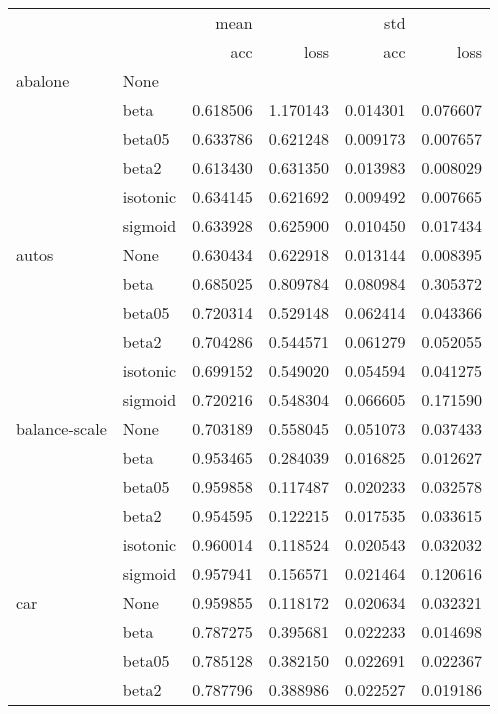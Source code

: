 \begin{tabular}{llrrrr}
\toprule
        &      &      mean &            &       std &           \\
        &      &       acc &       loss &       acc &      loss \\
\midrule
abalone & None &           &            &           &           \\
        & beta &  0.618506 &   1.170143 &  0.014301 &  0.076607 \\
        & beta05 &  0.633786 &   0.621248 &  0.009173 &  0.007657 \\
        & beta2 &  0.613430 &   0.631350 &  0.013983 &  0.008029 \\
        & isotonic &  0.634145 &   0.621692 &  0.009492 &  0.007665 \\
        & sigmoid &  0.633928 &   0.625900 &  0.010450 &  0.017434 \\
autos & None &  0.630434 &   0.622918 &  0.013144 &  0.008395 \\
        & beta &  0.685025 &   0.809784 &  0.080984 &  0.305372 \\
        & beta05 &  0.720314 &   0.529148 &  0.062414 &  0.043366 \\
        & beta2 &  0.704286 &   0.544571 &  0.061279 &  0.052055 \\
        & isotonic &  0.699152 &   0.549020 &  0.054594 &  0.041275 \\
        & sigmoid &  0.720216 &   0.548304 &  0.066605 &  0.171590 \\
balance-scale & None &  0.703189 &   0.558045 &  0.051073 &  0.037433 \\
        & beta &  0.953465 &   0.284039 &  0.016825 &  0.012627 \\
        & beta05 &  0.959858 &   0.117487 &  0.020233 &  0.032578 \\
        & beta2 &  0.954595 &   0.122215 &  0.017535 &  0.033615 \\
        & isotonic &  0.960014 &   0.118524 &  0.020543 &  0.032032 \\
        & sigmoid &  0.957941 &   0.156571 &  0.021464 &  0.120616 \\
car & None &  0.959855 &   0.118172 &  0.020634 &  0.032321 \\
        & beta &  0.787275 &   0.395681 &  0.022233 &  0.014698 \\
        & beta05 &  0.785128 &   0.382150 &  0.022691 &  0.022367 \\
        & beta2 &  0.787796 &   0.388986 &  0.022527 &  0.019186 \\

\end{tabular}
